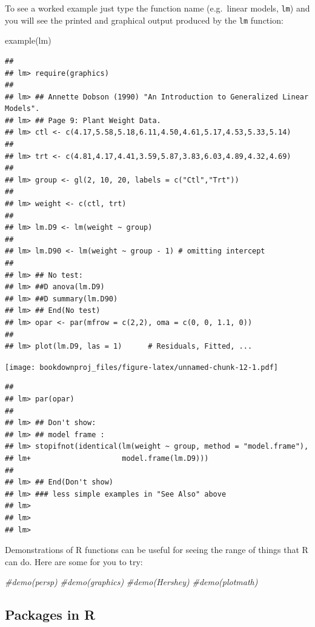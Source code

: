 \documentclass[
]{book}
\newenvironment{Shaded}{\begin{snugshade}}{\end{snugshade}}
\newcommand{\CommentTok}[1]{\textcolor[rgb]{0.56,0.35,0.01}{\textit{#1}}}
\newcommand{\FunctionTok}[1]{\textcolor[rgb]{0.00,0.00,0.00}{#1}}
\newcommand{\NormalTok}[1]{#1}
\begin{document}
To see a worked example just type the function name (e.g.~linear models, \texttt{lm}) and you will see the printed and graphical output produced by the \texttt{lm} function:

\begin{Shaded}
\begin{Highlighting}[]
\FunctionTok{example}\NormalTok{(lm)}
\end{Highlighting}
\end{Shaded}

\begin{verbatim}
## 
## lm> require(graphics)
## 
## lm> ## Annette Dobson (1990) "An Introduction to Generalized Linear Models".
## lm> ## Page 9: Plant Weight Data.
## lm> ctl <- c(4.17,5.58,5.18,6.11,4.50,4.61,5.17,4.53,5.33,5.14)
## 
## lm> trt <- c(4.81,4.17,4.41,3.59,5.87,3.83,6.03,4.89,4.32,4.69)
## 
## lm> group <- gl(2, 10, 20, labels = c("Ctl","Trt"))
## 
## lm> weight <- c(ctl, trt)
## 
## lm> lm.D9 <- lm(weight ~ group)
## 
## lm> lm.D90 <- lm(weight ~ group - 1) # omitting intercept
## 
## lm> ## No test: 
## lm> ##D anova(lm.D9)
## lm> ##D summary(lm.D90)
## lm> ## End(No test)
## lm> opar <- par(mfrow = c(2,2), oma = c(0, 0, 1.1, 0))
## 
## lm> plot(lm.D9, las = 1)      # Residuals, Fitted, ...
\end{verbatim}

\texttt{[image: bookdownproj\_files/figure-latex/unnamed-chunk-12-1.pdf]}

\begin{verbatim}
## 
## lm> par(opar)
## 
## lm> ## Don't show: 
## lm> ## model frame :
## lm> stopifnot(identical(lm(weight ~ group, method = "model.frame"),
## lm+                     model.frame(lm.D9)))
## 
## lm> ## End(Don't show)
## lm> ### less simple examples in "See Also" above
## lm> 
## lm> 
## lm>
\end{verbatim}

Demonstrations of R functions can be useful for seeing the range of things that R can do. Here are some for you to try:

\begin{Shaded}
\begin{Highlighting}[]
\CommentTok{\#demo(persp)}
\CommentTok{\#demo(graphics)}
\CommentTok{\#demo(Hershey)}
\CommentTok{\#demo(plotmath)}
\end{Highlighting}
\end{Shaded}

\hypertarget{packages-in-r}{%
\subsection{Packages in R}\label{packages-in-r}}
\end{document}
